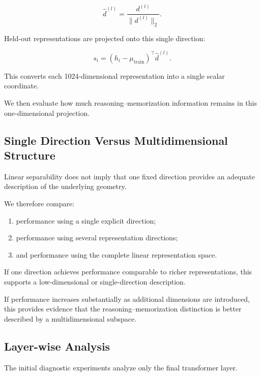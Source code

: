 \documentclass[11pt]{article}
\begin{document}
\[
\hat{d}^{(l)}
=
\frac{d^{(l)}}{\|d^{(l)}\|_2}.
\]

Held-out representations are projected onto this single direction:

\[
s_i
=
(h_i-\mu_{\mathrm{train}})^\top
\hat{d}^{(l)}.
\]

This converts each 1024-dimensional representation into a single
scalar coordinate.

We then evaluate how much reasoning--memorization information remains
in this one-dimensional projection.


\subsection{Single Direction Versus Multidimensional Structure}

Linear separability does not imply that one fixed direction provides
an adequate description of the underlying geometry.

We therefore compare:

\begin{enumerate}

    \item performance using a single explicit direction;

    \item performance using several representation directions;

    \item and performance using the complete linear representation
    space.

\end{enumerate}

If one direction achieves performance comparable to richer
representations, this supports a low-dimensional or
single-direction description.

If performance increases substantially as additional dimensions are
introduced, this provides evidence that the reasoning--memorization
distinction is better described by a multidimensional subspace.


\subsection{Layer-wise Analysis}

The initial diagnostic experiments analyze only the final transformer
layer.
\end{document}
